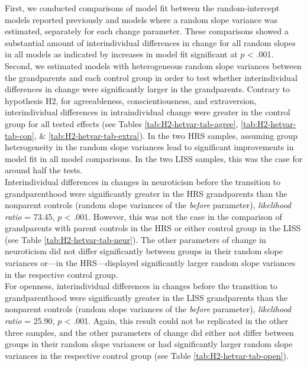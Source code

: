 \documentclass[
  english,
  man, noextraspace]{apa7}
\begin{document}
First, we conducted comparisons of model fit between the random-intercept models reported previously and models where a random slope variance was estimated, separately for each change parameter. These comparisons showed a substantial amount of interindividual differences in change for all random slopes in all models as indicated by increases in model fit significant at \(p\) \textless{} .001.\\
Second, we estimated models with heterogeneous random slope variances between the grandparents and each control group in order to test whether interindividual differences in change were significantly larger in the grandparents. Contrary to hypothesis H2, for agreeableness, conscientiousness, and extraversion, interindividual differences in intraindividual change were greater in the control group for all tested effects (see Tables \ref{tab:H2-hetvar-tab-agree}, \ref{tab:H2-hetvar-tab-con}, \& \ref{tab:H2-hetvar-tab-extra}). In the two HRS samples, assuming group heterogeneity in the random slope variances lead to significant improvements in model fit in all model comparisons. In the two LISS samples, this was the case for around half the tests.\\
Interindividual differences in changes in neuroticism before the transition to grandparenthood were significantly greater in the HRS grandparents than the nonparent controls (random slope variances of the \emph{before} parameter), \emph{likelihood ratio} = 73.45, \(p\) \textless{} .001. However, this was not the case in the comparison of grandparents with parent controls in the HRS or either control group in the LISS (see Table \ref{tab:H2-hetvar-tab-neur}). The other parameters of change in neuroticism did not differ significantly between groups in their random slope variances or---in the HRS---displayed significantly larger random slope variances in the respective control group.\\
For openness, interindividual differences in changes before the transition to grandparenthood were significantly greater in the LISS grandparents than the nonparent controls (random slope variances of the \emph{before} parameter), \emph{likelihood ratio} = 25.90, \(p\) \textless{} .001. Again, this result could not be replicated in the other three samples, and the other parameters of change did either not differ between groups in their random slope variances or had significantly larger random slope variances in the respective control group (see Table \ref{tab:H2-hetvar-tab-open}).\\
\end{document}

